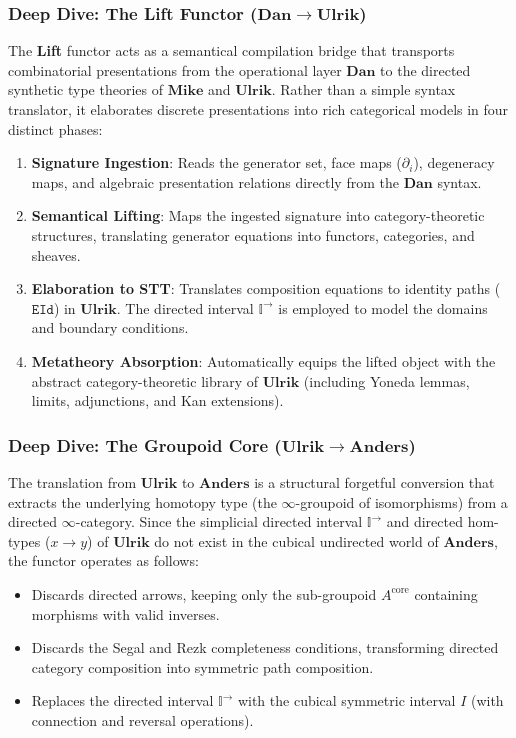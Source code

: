 \documentclass{article}
\theoremstyle{definition}
\theoremstyle{plain}
\begin{document}
\newpage

\subsubsection{Deep Dive: The Lift Functor
(\texorpdfstring{$\mathbf{Dan} \to \mathbf{Ulrik}$}{Dan -> Ulrik})}

The \textbf{Lift} functor acts as a semantical compilation bridge that transports combinatorial presentations from
the operational layer $\mathbf{Dan}$ to the directed synthetic type theories of $\mathbf{Mike}$ and $\mathbf{Ulrik}$.
Rather than a simple syntax translator, it elaborates discrete presentations into rich categorical models in four distinct phases:

\begin{enumerate}
    \item \textbf{Signature Ingestion}: Reads the generator set, face maps ($\partial_i$), degeneracy maps, and algebraic presentation relations directly from the $\mathbf{Dan}$ syntax.
    \item \textbf{Semantical Lifting}: Maps the ingested signature into category-theoretic structures, translating generator equations into functors, categories, and sheaves.
    \item \textbf{Elaboration to STT}: Translates composition equations to identity paths ($\mathtt{EId}$) in $\mathbf{Ulrik}$. The directed interval $\mathbb{I}^{\to}$ is employed to model the domains and boundary conditions.
    \item \textbf{Metatheory Absorption}: Automatically equips the lifted object with the abstract category-theoretic library of $\mathbf{Ulrik}$ (including Yoneda lemmas, limits, adjunctions, and Kan extensions).
\end{enumerate}

\subsubsection{Deep Dive: The Groupoid Core (\texorpdfstring{$\mathbf{Ulrik} \to \mathbf{Anders}$}{Ulrik -> Anders})}
The translation from $\mathbf{Ulrik}$ to $\mathbf{Anders}$ is a structural forgetful conversion that extracts the underlying homotopy type (the $\infty$-groupoid of isomorphisms) from a directed $\infty$-category. Since the simplicial directed interval $\mathbb{I}^{\to}$ and directed hom-types ($x \to y$) of $\mathbf{Ulrik}$ do not exist in the cubical undirected world of $\mathbf{Anders}$, the functor operates as follows:
\begin{itemize}
    \item Discards directed arrows, keeping only the sub-groupoid $A^{\mathrm{core}}$ containing morphisms with valid inverses.
    \item Discards the Segal and Rezk completeness conditions, transforming directed category composition into symmetric path composition.
    \item Replaces the directed interval $\mathbb{I}^{\to}$ with the cubical symmetric interval $I$ (with connection and reversal operations).
\end{itemize}
\end{document}
